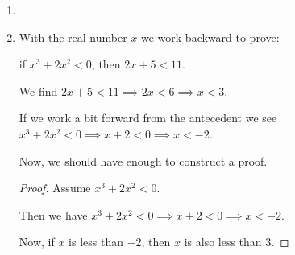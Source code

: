 \documentclass[12pt,letterpaper]{article}
\begin{document}
\begin{enumerate}
\begin{enumerate}
\begin{enumerate}
              So $3(b + c) = 3aq + ap \implies 3ar = 3aq + ap \implies 3r = 3q + p \implies 3r - 3q = p \implies 3(r - q) = p$.

              Looks like we can construct a proof if we can assume $p = 3(r - q)$.

              \begin{proof}
                Assume $a$ divides $b$ and $a$ divides $b + c$.

                These mean there exist integers $q, r$ such that $b = aq, b + c = ar$.

                Now construct another integer $p = 3(r - q)$.

                Then,
                \begin{align*}
                  3(r - q) &= p \\
                  3a(r - q) &= ap \\
                  3(ar - aq) &= ap \\
                  3(b + c - b) &= ap \\
                  3c &= ap \\
                \end{align*}

                So, we have that $a$ divides $3c$.

                Thus, if $a$ divides $b$ and $a$ divides $b + c$, then $a$ divides $3c$.
              \end{proof}
            \item
            \item
              With the real number $x$ we work backward to prove:

              if $x^3 + 2x^2 < 0$, then $2x + 5 < 11$.

              We find $2x + 5 < 11 \implies 2x < 6 \implies x < 3$.

              If we work a bit forward from the antecedent we see
              $x^3 + 2x^2 < 0 \implies x + 2 < 0 \implies x < -2$.

              Now, we should have enough to construct a proof.

              \begin{proof}
                Assume $x^3 + 2x^2 < 0$.

                Then we have
                $x^3 + 2x^2 < 0 \implies x + 2 < 0 \implies x < -2$.

                Now, if $x$ is less than $-2$, then $x$ is also less than 3.


\end{proof}
\end{enumerate}
\end{enumerate}
\end{enumerate}
\end{document}
